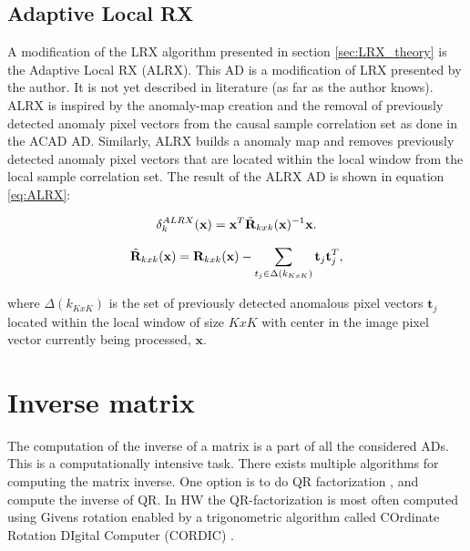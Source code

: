 


\subsection{Adaptive Local RX}
\label{sec:Adaptive_LRX_theory}
A modification of the LRX algorithm presented in section \ref{sec:LRX_theory} is the Adaptive Local RX (ALRX). This AD is a modification of LRX presented by the author. It is not yet described in literature (as far as the author knows). 
\\

ALRX is inspired by the anomaly-map creation and the removal of previously detected anomaly pixel vectors from the causal sample correlation set as done in the ACAD AD. Similarly, ALRX builds a anomaly map and removes previously detected anomaly pixel vectors that are located within the local window from the local sample correlation set. The result of the ALRX AD is shown in equation \ref{eq:ALRX}: 

\begin{equation}
    \delta_k^{ALRX}(\textbf{x}) = \textbf{x}^T\Tilde{\textbf{R}}_{k x k}(\textbf{x})^{-1}\textbf{x}.
    \label{eq:ALRX}
\end{equation}


\begin{equation}
   \Tilde{\textbf{R}}_{k x k}(\textbf{x})= \textbf{R}_{k x k}(\textbf{x})-\sum_{t_j\in\Delta(k_{KxK})}\textbf{t}_j\textbf{t}_j^T,
    \label{eq:ALRX_anomaly_removed}
\end{equation}

where $\Delta(k_{KxK})$ is the set of previously detected anomalous pixel vectors $\textbf{t}_j$ located within the local window of size $KxK$ with center in the image pixel vector currently being processed, $\textbf{x}$.


\section{Inverse matrix}
The computation of the inverse of a matrix is a part of all the considered ADs. This is a computationally intensive task. There exists multiple algorithms for computing the matrix inverse. One option is to do QR factorization \cite{QRD_fpga}, and compute the inverse of QR. In HW the QR-factorization is most often computed using Givens rotation enabled by a trigonometric algorithm called COrdinate Rotation DIgital Computer (CORDIC) \cite{CORDIC}. \\

